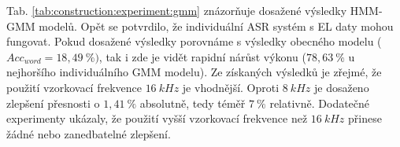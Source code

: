 



Tab. \ref{tab:construction:experiment:gmm} znázorňuje dosažené výsledky HMM-GMM modelů. Opět se potvrdilo, že individuální ASR systém s EL daty mohou fungovat. Pokud dosažené výsledky porovnáme s výsledky obecného modelu ($Acc_{word} = 18,49\ \%)$, tak i zde je vidět rapidní nárůst výkonu ($78,63\ \%$ u nejhoršího individuálního GMM modelu). Ze získaných výsledků je zřejmé, že použití vzorkovací frekvence $16\ kHz$ je vhodnější. Oproti $8\ kHz$ je dosaženo zlepšení přesnosti o $1,41\ \%$ absolutně, tedy téměř $7\ \%$ relativně. Dodatečné experimenty ukázaly, že použití vyšší vzorkovací frekvence než $16\ kHz$ přinese žádné nebo zanedbatelné zlepšení.

